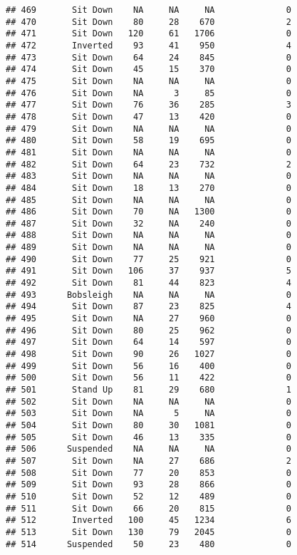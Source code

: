 \documentclass[
]{article}
\begin{document}
\begin{verbatim}
## 469       Sit Down    NA     NA     NA              0
## 470       Sit Down    80     28    670              2
## 471       Sit Down   120     61   1706              0
## 472       Inverted    93     41    950              4
## 473       Sit Down    64     24    845              0
## 474       Sit Down    45     15    370              0
## 475       Sit Down    NA     NA     NA              0
## 476       Sit Down    NA      3     85              0
## 477       Sit Down    76     36    285              3
## 478       Sit Down    47     13    420              0
## 479       Sit Down    NA     NA     NA              0
## 480       Sit Down    58     19    695              0
## 481       Sit Down    NA     NA     NA              0
## 482       Sit Down    64     23    732              2
## 483       Sit Down    NA     NA     NA              0
## 484       Sit Down    18     13    270              0
## 485       Sit Down    NA     NA     NA              0
## 486       Sit Down    70     NA   1300              0
## 487       Sit Down    32     NA    240              0
## 488       Sit Down    NA     NA     NA              0
## 489       Sit Down    NA     NA     NA              0
## 490       Sit Down    77     25    921              0
## 491       Sit Down   106     37    937              5
## 492       Sit Down    81     44    823              4
## 493      Bobsleigh    NA     NA     NA              0
## 494       Sit Down    87     23    825              4
## 495       Sit Down    NA     27    960              0
## 496       Sit Down    80     25    962              0
## 497       Sit Down    64     14    597              0
## 498       Sit Down    90     26   1027              0
## 499       Sit Down    56     16    400              0
## 500       Sit Down    56     11    422              0
## 501       Stand Up    81     29    680              1
## 502       Sit Down    NA     NA     NA              0
## 503       Sit Down    NA      5     NA              0
## 504       Sit Down    80     30   1081              0
## 505       Sit Down    46     13    335              0
## 506      Suspended    NA     NA     NA              0
## 507       Sit Down    NA     27    686              2
## 508       Sit Down    77     20    853              0
## 509       Sit Down    93     28    866              0
## 510       Sit Down    52     12    489              0
## 511       Sit Down    66     20    815              0
## 512       Inverted   100     45   1234              6
## 513       Sit Down   130     79   2045              0
## 514      Suspended    50     23    480              0

\end{verbatim}
\end{document}
